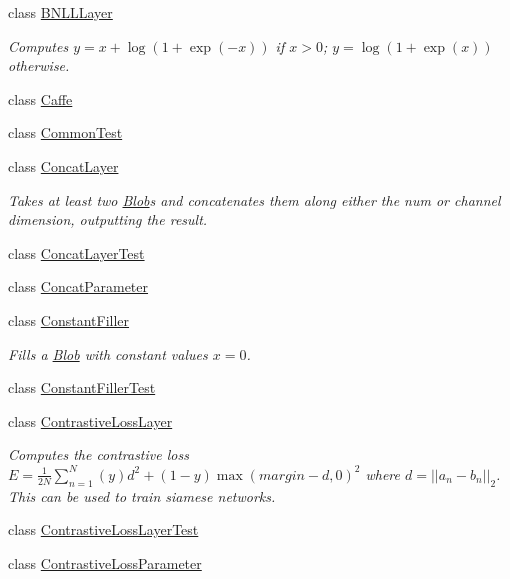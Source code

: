 \begin{DoxyCompactItemize}
\item 
class \mbox{\hyperlink{classcaffe_1_1_b_n_l_l_layer}{B\+N\+L\+L\+Layer}}
\begin{DoxyCompactList}\small\item\em Computes $ y = x + \log(1 + \exp(-x)) $ if $ x > 0 $; $ y = \log(1 + \exp(x)) $ otherwise. \end{DoxyCompactList}\item 
class \mbox{\hyperlink{classcaffe_1_1_caffe}{Caffe}}
\item 
class \mbox{\hyperlink{classcaffe_1_1_common_test}{Common\+Test}}
\item 
class \mbox{\hyperlink{classcaffe_1_1_concat_layer}{Concat\+Layer}}
\begin{DoxyCompactList}\small\item\em Takes at least two \mbox{\hyperlink{classcaffe_1_1_blob}{Blob}}s and concatenates them along either the num or channel dimension, outputting the result. \end{DoxyCompactList}\item 
class \mbox{\hyperlink{classcaffe_1_1_concat_layer_test}{Concat\+Layer\+Test}}
\item 
class \mbox{\hyperlink{classcaffe_1_1_concat_parameter}{Concat\+Parameter}}
\item 
class \mbox{\hyperlink{classcaffe_1_1_constant_filler}{Constant\+Filler}}
\begin{DoxyCompactList}\small\item\em Fills a \mbox{\hyperlink{classcaffe_1_1_blob}{Blob}} with constant values $ x = 0 $. \end{DoxyCompactList}\item 
class \mbox{\hyperlink{classcaffe_1_1_constant_filler_test}{Constant\+Filler\+Test}}
\item 
class \mbox{\hyperlink{classcaffe_1_1_contrastive_loss_layer}{Contrastive\+Loss\+Layer}}
\begin{DoxyCompactList}\small\item\em Computes the contrastive loss $ E = \frac{1}{2N} \sum\limits_{n=1}^N \left(y\right) d^2 + \left(1-y\right) \max \left(margin-d, 0\right)^2 $ where $ d = \left| \left| a_n - b_n \right| \right|_2 $. This can be used to train siamese networks. \end{DoxyCompactList}\item 
class \mbox{\hyperlink{classcaffe_1_1_contrastive_loss_layer_test}{Contrastive\+Loss\+Layer\+Test}}
\item 
class \mbox{\hyperlink{classcaffe_1_1_contrastive_loss_parameter}{Contrastive\+Loss\+Parameter}}

\end{DoxyCompactItemize}

